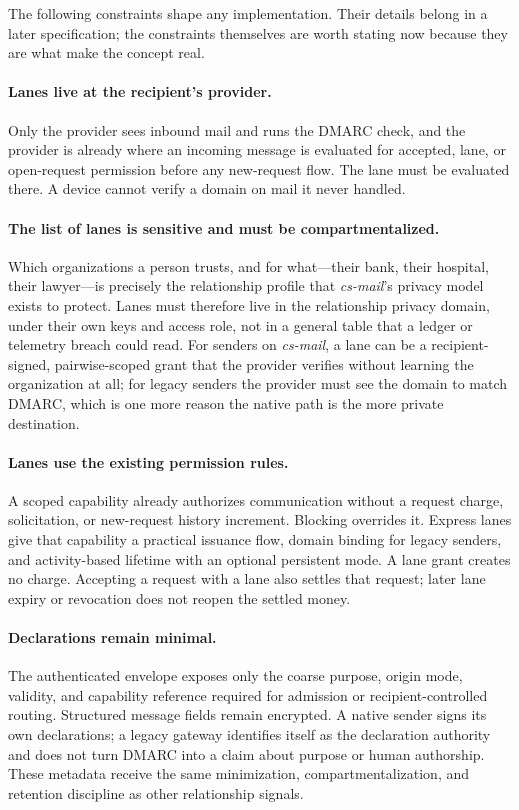 \documentclass[11pt]{article}
\begin{document}
The following constraints shape any implementation. Their details belong in a later
specification; the constraints themselves are worth stating now because they are
what make the concept real.

\paragraph{Lanes live at the recipient's provider.}
Only the provider sees inbound mail and runs the DMARC check, and the provider is
already where an incoming message is evaluated for accepted, lane, or open-request permission before any new-request flow.
The lane must be evaluated there. A device cannot verify a domain on mail it never
handled.

\paragraph{The list of lanes is sensitive and must be compartmentalized.}
Which organizations a person trusts, and for what---their bank, their hospital,
their lawyer---is precisely the relationship profile that \textit{cs-mail}'s
privacy model exists to protect. Lanes must therefore live in the relationship
privacy domain, under their own keys and access role, not in a general table that
a ledger or telemetry breach could read. For senders on \textit{cs-mail}, a lane
can be a recipient-signed, pairwise-scoped grant that the provider verifies
without learning the organization at all; for legacy senders the provider must see
the domain to match DMARC, which is one more reason the native path is the more
private destination.

\paragraph{Lanes use the existing permission rules.}
A scoped capability already authorizes communication without a request charge,
solicitation, or new-request history increment. Blocking overrides it. Express
lanes give that capability a practical issuance flow, domain binding for legacy
senders, and activity-based lifetime with an optional persistent mode. A lane
grant creates no charge. Accepting a request with a lane also settles that
request; later lane expiry or revocation does not reopen the settled money.

\paragraph{Declarations remain minimal.}
The authenticated envelope exposes only the coarse purpose, origin mode, validity,
and capability reference required for admission or recipient-controlled routing.
Structured message fields remain encrypted. A native sender signs its own
declarations; a legacy gateway identifies itself as the declaration authority and
does not turn DMARC into a claim about purpose or human authorship. These metadata
receive the same minimization, compartmentalization, and retention discipline as
other relationship signals.
\end{document}
